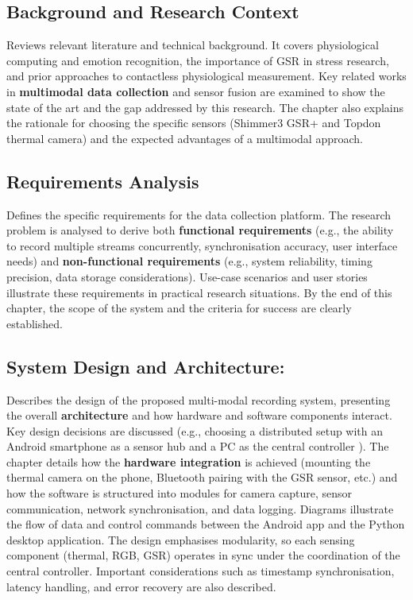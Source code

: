 \subsection{Background and Research Context} Reviews relevant literature and technical background. It covers physiological computing and emotion recognition, the importance of GSR in stress research, and prior approaches to contactless physiological measurement. Key related works in \textbf{multimodal data collection} and sensor fusion are examined to show the state of the art and the gap addressed by this research. The chapter also explains the rationale for choosing the specific sensors (Shimmer3 GSR+ and Topdon thermal camera) and the expected advantages of a multimodal approach.

\subsection{Requirements Analysis} Defines the specific requirements for the data collection platform. The research problem is analysed to derive both \textbf{functional requirements} (e.g., the ability to record multiple streams concurrently, synchronisation accuracy, user interface needs) and \textbf{non-functional requirements} (e.g., system reliability, timing precision, data storage considerations). Use-case scenarios and user stories illustrate these requirements in practical research situations. By the end of this chapter, the scope of the system and the criteria for success are clearly established.

\subsection{System Design and Architecture:} Describes the design of the proposed multi-modal recording system, presenting the overall \textbf{architecture} and how hardware and software components interact. Key design decisions are discussed (e.g., choosing a distributed setup with an Android smartphone as a sensor hub and a PC as the central controller \cite{ref9}). The chapter details how the \textbf{hardware integration} is achieved (mounting the thermal camera on the phone, Bluetooth pairing with the GSR sensor, etc.) and how the software is structured into modules for camera capture, sensor communication, network synchronisation, and data logging. Diagrams illustrate the flow of data and control commands between the Android app and the Python desktop application. The design emphasises modularity, so each sensing component (thermal, RGB, GSR) operates in sync under the coordination of the central controller. Important considerations such as timestamp synchronisation, latency handling, and error recovery are also described.

